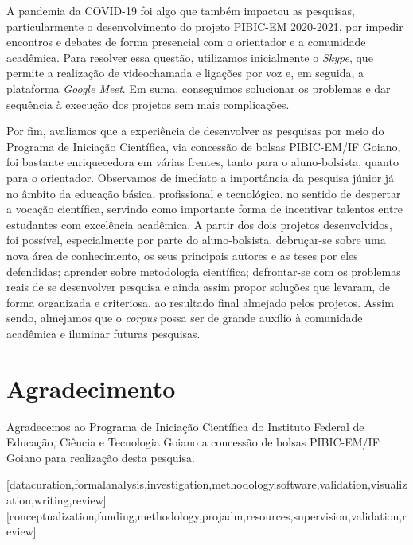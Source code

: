 \documentclass[portuguese]{textolivre}
\begin{document}
A pandemia da COVID-19 foi algo que também impactou as pesquisas, particularmente o desenvolvimento do projeto PIBIC-EM 2020-2021, por impedir encontros e debates de forma presencial com o orientador e a comunidade acadêmica. Para resolver essa questão, utilizamos inicialmente o \textit{Skype}, que permite a realização de videochamada e ligações por voz e, em seguida, a plataforma \textit{Google Meet}. Em suma, conseguimos solucionar os problemas e dar sequência à execução dos projetos sem mais complicações. 

Por fim, avaliamos que a experiência de desenvolver as pesquisas por meio do Programa de Iniciação Científica, via concessão de bolsas PIBIC-EM/IF Goiano, foi bastante enriquecedora em várias frentes, tanto para o aluno-bolsista, quanto para o orientador. Observamos de imediato a importância da pesquisa júnior já no âmbito da educação básica, profissional e tecnológica, no sentido de despertar a vocação científica, servindo como importante forma de incentivar talentos entre estudantes com excelência acadêmica. A partir dos dois projetos desenvolvidos, foi possível, especialmente por parte do aluno-bolsista, debruçar-se sobre uma nova área de conhecimento, os seus principais autores e as teses por eles defendidas; aprender sobre metodologia científica; defrontar-se com os problemas reais de se desenvolver pesquisa e ainda assim propor soluções que levaram, de forma organizada e criteriosa, ao resultado final almejado pelos projetos. Assim sendo, almejamos que o \textit{corpus} possa ser de grande auxílio à comunidade acadêmica e iluminar futuras pesquisas.

\section{Agradecimento}
Agradecemos ao Programa de Iniciação Científica do Instituto Federal de Educação, Ciência e Tecnologia Goiano a concessão de bolsas PIBIC-EM/IF Goiano para realização desta pesquisa.

\printbibliography\label{sec-bib}


\begin{contributors}
[datacuration,formalanalysis,investigation,methodology,software,validation,visualization,writing,review]
[conceptualization,funding,methodology,projadm,resources,supervision,validation,review]
\end{contributors}
\end{document}
